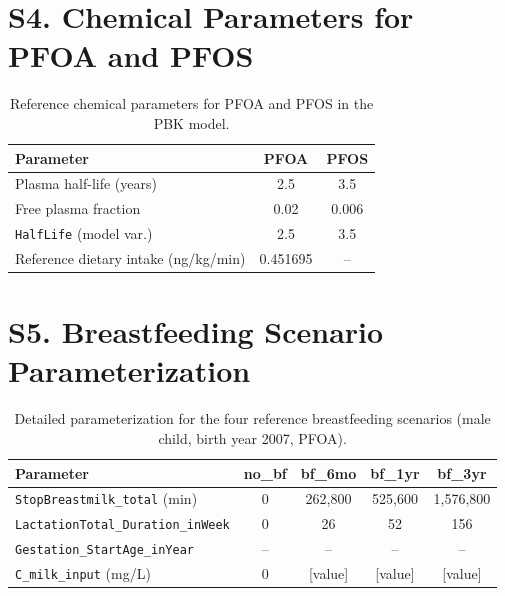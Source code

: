 \documentclass[12pt]{article}
\begin{document}
\section*{S4. Chemical Parameters for PFOA and PFOS}

\begin{table}[h]
\centering
\caption{Reference chemical parameters for PFOA and PFOS in the
PBK model.}
\label{tab:chem_params}
\begin{tabular}{lcc}
\toprule
\textbf{Parameter} & \textbf{PFOA} & \textbf{PFOS} \\
\midrule
Plasma half-life (years)       & 2.5  & 3.5   \\
Free plasma fraction           & 0.02 & 0.006 \\
\texttt{HalfLife} (model var.) & 2.5  & 3.5   \\
Reference dietary intake (ng/kg/min) & 0.451695 & -- \\
\bottomrule
\end{tabular}
\end{table}


\section*{S5. Breastfeeding Scenario Parameterization}

\begin{table}[h]
\centering
\caption{Detailed parameterization for the four reference breastfeeding
scenarios (male child, birth year 2007, PFOA).}
\label{tab:scenario_params}
\begin{tabular}{lcccc}
\toprule
\textbf{Parameter} & \textbf{no\_bf} & \textbf{bf\_6mo} &
\textbf{bf\_1yr} & \textbf{bf\_3yr} \\
\midrule
\texttt{StopBreastmilk\_total} (min)
  & 0 & 262,800 & 525,600 & 1,576,800 \\
\texttt{LactationTotal\_Duration\_inWeek}
  & 0 & 26 & 52 & 156 \\
\texttt{Gestation\_StartAge\_inYear}
  & -- & -- & -- & -- \\
\texttt{C\_milk\_input} (mg/L)
  & 0 & [value] & [value] & [value] \\
\bottomrule
\end{tabular}
\end{table}
\end{document}
